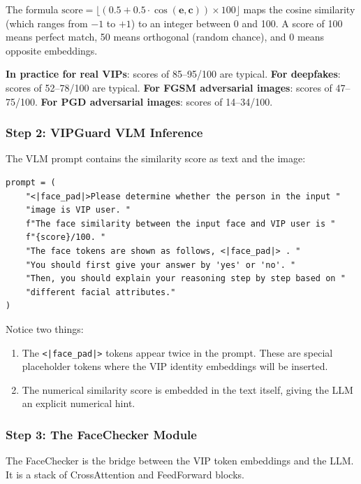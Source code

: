 \documentclass[12pt,a4paper]{article}
\begin{document}
The formula $\text{score} = \lfloor (0.5 + 0.5 \cdot \cos(\mathbf{e}, \mathbf{c})) \times 100 \rfloor$ maps the cosine similarity (which ranges from $-1$ to $+1$) to an integer between 0 and 100. A score of 100 means perfect match, 50 means orthogonal (random chance), and 0 means opposite embeddings.

\textbf{In practice for real VIPs}: scores of 85--95/100 are typical.\newline
\textbf{For deepfakes}: scores of 52--78/100 are typical.\newline
\textbf{For FGSM adversarial images}: scores of 47--75/100.\newline
\textbf{For PGD adversarial images}: scores of 14--34/100.

\subsubsection{Step 2: VIPGuard VLM Inference}

The VLM prompt contains the similarity score as text and the image:

\begin{lstlisting}[caption={VIPGuard prompt format}]
prompt = (
    "<|face_pad|>Please determine whether the person in the input "
    "image is VIP user. "
    f"The face similarity between the input face and VIP user is "
    f"{score}/100. "
    "The face tokens are shown as follows, <|face_pad|> . "
    "You should first give your answer by 'yes' or 'no'. "
    "Then, you should explain your reasoning step by step based on "
    "different facial attributes."
)
\end{lstlisting}

Notice two things:
\begin{enumerate}
    \item The \texttt{<|face\_pad|>} tokens appear twice in the prompt. These are special placeholder tokens where the VIP identity embeddings will be inserted.
    \item The numerical similarity score is embedded in the text itself, giving the LLM an explicit numerical hint.
\end{enumerate}

\subsubsection{Step 3: The FaceChecker Module}

The FaceChecker is the bridge between the VIP token embeddings and the LLM. It is a stack of CrossAttention and FeedForward blocks.
\end{document}
